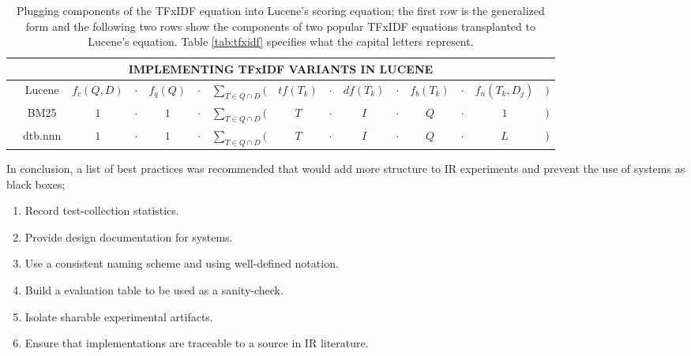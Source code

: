 \begin{table}[bht!]
	\small
  \centering
  \begin{tabular}{lcccccccccccccc}
    \multicolumn{15}{c}{IMPLEMENTING TFxIDF VARIANTS IN LUCENE}
    \\
    \hline\hline

    & Lucene  & $f_{c}(Q,D)$     & $\cdot$ & $f_{q}(Q)$
    & $\cdot$ & $\displaystyle\sum_{T \in Q \cap D}($     & $tf(T_{k})$
    & $\cdot$ & $df(T_{k})$      & $\cdot$ & $f_{b}(T_{k})$
    & $\cdot$ & $f_{n}(T_{k}, D_{j})$      & $)$ \\
    
    & BM25    & $1$              &  $\cdot$ & $1$
    & $\cdot$ & $\displaystyle\sum_{T \in Q \cap D}($      & $T$
    & $\cdot$ & $I$              & $\cdot$  & $Q$
    & $\cdot$ & $1$              & $)$ \\

    & dtb.nnn & $1$              & $\cdot$ & $1$
    & $\cdot$ & $\displaystyle\sum_{T \in Q \cap D}($     & $T$
    & $\cdot$ & $I$              & $\cdot$ & $Q$
    & $\cdot$ & $L$              & $)$ \\

    \hline\hline
  \end{tabular}

  \caption{Plugging components of the TFxIDF equation into Lucene's
    scoring equation; the first row is the generalized form and the
    following two rows show the components of two popular TFxIDF
    equations transplanted to Lucene's equation. Table
    \ref{tab:tfxidf} specifies what the capital letters represent.}

  \label{tab:lucene}

\end{table}

In conclusion, a list of best practices was recommended that would add
more structure to IR experiments and prevent the use of systems as
black boxes;

\begin{enumerate}

\item Record test-collection statistics.

\item Provide design documentation for systems.

\item Use a consistent naming scheme and using well-defined notation.

\item Build a evaluation table to be used as a sanity-check.

\item Isolate sharable experimental artifacts.

\item Ensure that implementations are traceable to a source in IR
  literature.

\end{enumerate}

